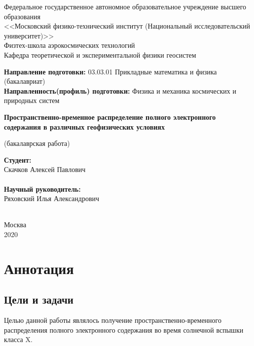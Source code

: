 \documentclass[a4paper]{article}
\begin{document}
\begin{center}
\small
Федеральное государственное автономное образовательное учреждение высшего образования\\
<<Московский физико-технический институт (Национальный исследовательский университет)>> \\
Физтех-школа аэрокосмических технологий\\
Кафедра теоретической и экспериментальной физики геосистем
\end{center}

\begin{flushleft}
\small
\textbf{Направление подготовки:} 03.03.01 Прикладные математика и физика (бакалавриат)\\
\textbf{Направленность(профиль) подготовки:} Физика и механика космических и природных систем\\
\end{flushleft}

\begin{center}
\LARGE
\textbf{Пространственно-временное распределение полного электронного содержания в различных геофизических условиях}

\small(бакалаврская работа)
\end{center}


\begin{flushright}

\noindent
\textbf{Студент:} \\
Скачков Алексей Павлович\\
\underline{\hspace{3cm}}\\
\textbf{Научный руководитель:}\\
Ряховский Илья Александрович\\
\underline{\hspace{3cm}}\\

\end{flushright}

\begin{center}
\small
Москва\\
2020
\end{center}


\newpage
\section*{Аннотация}

\subsection*{Цели и задачи}
Целью данной работы являлось получение пространственно-временного распределения полного электронного содержания во время солнечной вспышки класса X.\\
\end{document}
